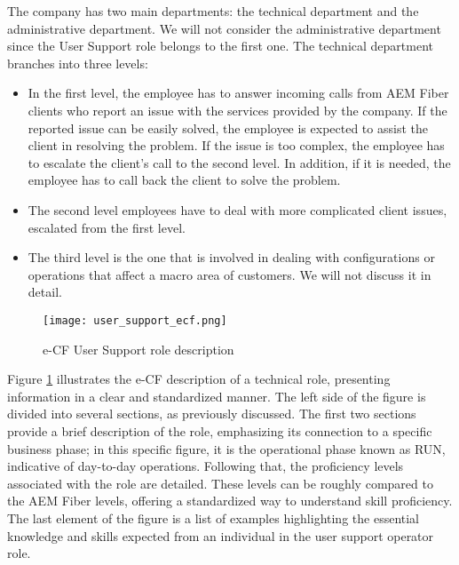 The company has two main departments: the technical department and the administrative department. We will not consider the administrative department since the User Support role belongs to the first one. The technical department branches into three levels:
\begin{itemize}
      \item In the first level, the employee has to answer incoming calls from AEM Fiber clients who report an issue with the services provided by the company. If the reported issue can be easily solved, the employee is expected to assist the client in resolving the problem. If the issue is too complex, the employee has to escalate the client's call to the second level. In addition, if it is needed, the employee has to call back the client to solve the problem.
      \item The second level employees have to deal with more complicated client issues, escalated from the first level.
      \item The third level is the one that is involved in dealing with configurations or operations that affect a macro area of customers. We will not discuss it in detail.
\end{itemize}

\begin{center}
      \begin{figure}[ht]
            \centering
            \texttt{[image: user\_support\_ecf.png]}
            \caption[short]{e-CF User Support role description}
            \label{fig:usersupportecf}
      \end{figure}
\end{center}


Figure \ref{fig:usersupportecf} illustrates the e-CF description of a technical role, presenting information in a clear and standardized manner. The left side of the figure is divided into several sections, as previously discussed. The first two sections provide a brief description of the role, emphasizing its connection to a specific business phase; in this specific figure, it is the operational phase known as RUN, indicative of day-to-day operations. Following that, the proficiency levels associated with the role are detailed. These levels can be roughly compared to the AEM Fiber levels, offering a standardized way to understand skill proficiency. The last element of the figure is a list of examples highlighting the essential knowledge and skills expected from an individual in the user support operator role.\\


